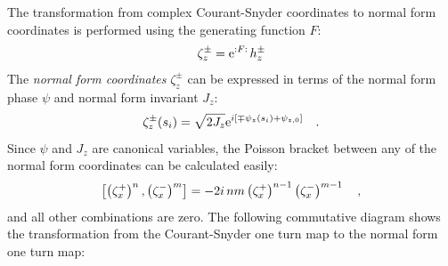 %
The transformation from complex Courant-Snyder coordinates to normal form coordinates is performed
using the generating function $F$:
%
\begin{equation}
    \zeta_z^\pm = \text{e}^{{:}F{:}\,} h_z^\pm
    \label{eq_hfromz}
\end{equation}
%
The \emph{normal form coordinates} $\zeta_z^\pm$
can be expressed in terms of the normal form phase $\psi$ and normal form invariant $J_z$:
%
\begin{equation}
    \zeta_z^\pm(s_i) = \sqrt{2J_z}\text{e}^{i\left[\mp \psi_z(s_i) + \psi_{z,0} \right]}
    \quad .
\end{equation}
%
Since $\psi$ and $J_z$ are canonical variables, the Poisson bracket between any of the normal form
coordinates can be calculated easily:
%
\begin{equation}
    \left[ \left(\zeta_x^+\right)^{n}, \left(\zeta_x^-\right)^{m}\right] = -2i\,nm\left(\zeta_x^+\right)^{n-1}\left(\zeta_x^-\right)^{m-1}
    \quad ,
    \label{eq_poiss_br_ident}
\end{equation}
and all other combinations are zero.
%
The following commutative diagram shows the transformation from the Courant-Snyder one turn map to 
the normal form one turn map:

